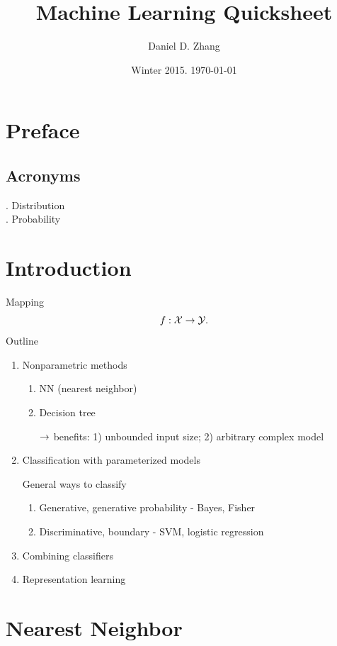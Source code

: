 \documentclass[a4paper]{report}
\begin{document}
\title{Machine Learning Quicksheet}
\author{Daniel D. Zhang}
\date{Winter 2015. \today}
\maketitle


\tableofcontents
\chapter*{Preface}
\section*{Acronyms}
\begin{obeylines}
. Distribution
. Probability
\end{obeylines}
\chapter{Introduction}
Mapping
$$
f: \mathcal{X} \rightarrow \mathcal{Y}. 
$$
Outline 
\begin{enumerate}
\item Nonparametric methods
\begin{enumerate}
\item NN (nearest neighbor)
\item Decision tree 

$\rightarrow$ benefits: 1) unbounded input size; 2) arbitrary complex model
\end{enumerate}
\item Classification with parameterized models 

General ways to classify 
\begin{enumerate}
\item Generative, generative probability - Bayes, Fisher 
\item Discriminative, boundary - SVM, logistic regression 
\end{enumerate}
\item Combining classifiers 
\item Representation learning 
\end{enumerate}

\chapter{Nearest Neighbor}
\end{document}
